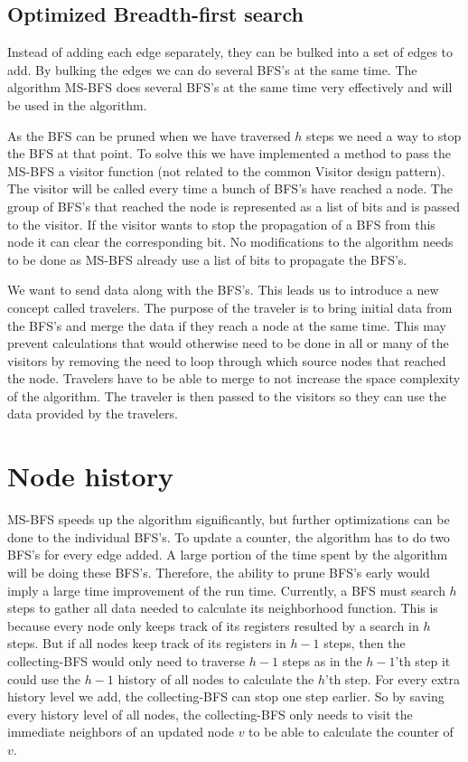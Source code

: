 \subsection{Optimized Breadth-first search}

Instead of adding each edge separately, they can be bulked into a set of edges to add. By bulking the edges we can do several BFS's at the same time. The algorithm MS-BFS \cite{msbfs} does several BFS's at the same time very effectively and will be used in the algorithm. 

As the BFS can be pruned when we have traversed $h$ steps we need a way to stop the BFS at that point. To solve this we have implemented a method to pass the MS-BFS a visitor function (not related to the common Visitor design pattern). The visitor will be called every time a bunch of BFS's have reached a node. The group of BFS's that reached the node is represented as a list of bits and is passed to the visitor. If the visitor wants to stop the propagation of a BFS from this node it can clear the corresponding bit. No modifications to the algorithm needs to be done as MS-BFS already use a list of bits to propagate the BFS's.

We want to send data along with the BFS's. This leads us to introduce a new concept called travelers. The purpose of the traveler is to bring initial data from the BFS's and merge the data if they reach a node at the same time. This may prevent calculations that would otherwise need to be done in all or many of the visitors by removing the need to loop through which source nodes that reached the node. Travelers have to be able to merge to not increase the space complexity of the algorithm. The traveler is then passed to the visitors so they can use the data provided by the travelers. 

\section{Node history}

MS-BFS speeds up the algorithm significantly, but further optimizations can be done to the individual BFS's. To update a counter, the algorithm has to do two BFS's for every edge added. A large portion of the time spent by the algorithm will be doing these BFS's. Therefore, the ability to prune BFS's early would imply a large time improvement of the run time. Currently, a BFS must search $h$ steps to gather all data needed to calculate its neighborhood function. This is because every node only keeps track of its registers resulted by a search in $h$ steps. But if all nodes keep track of its registers in $h-1$ steps, then the collecting-BFS would only need to traverse $h-1$ steps as in the $h-1$'th step it could use the $h-1$ history of all nodes to calculate the $h$'th step. For every extra history level we add, the collecting-BFS can stop one step earlier. So by saving every history level of all nodes, the collecting-BFS only needs to visit the immediate neighbors of an updated node $v$ to be able to calculate the counter of $v$. 

